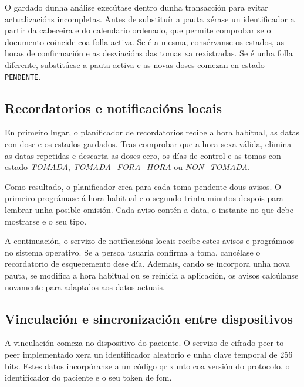 O gardado dunha análise execútase dentro dunha transacción para evitar actualizacións incompletas. Antes de substituír a pauta xérase un identificador a partir da cabeceira e do calendario ordenado, que permite comprobar se o documento coincide coa folla activa. Se é a mesma, consérvanse os estados, as horas de confirmación e as desviacións das tomas xa rexistradas. Se é unha folla diferente, substitúese a pauta activa e as novas doses comezan en estado \texttt{PENDENTE}.


\subsection{Recordatorios e notificacións locais}

En primeiro lugar, o planificador de recordatorios recibe a hora habitual, as datas con dose e os estados gardados. Tras comprobar que a hora sexa válida, elimina as datas repetidas e descarta as doses cero, os días de control e as tomas con estado \textit{TOMADA}, \textit{TOMADA\_FORA\_HORA} ou \textit{NON\_TOMADA}.

Como resultado, o planificador crea para cada toma pendente dous avisos. O primeiro prográmase á hora habitual e o segundo trinta minutos despois para lembrar unha posible omisión. Cada aviso contén a data, o instante no que debe mostrarse e o seu tipo.

A continuación, o servizo de notificacións locais recibe estes avisos e prográmaos no sistema operativo. Se a persoa usuaria confirma a toma, cancélase o recordatorio de esquecemento dese día. Ademais, cando se incorpora unha nova pauta, se modifica a hora habitual ou se reinicia a aplicación, os avisos calcúlanse novamente para adaptalos aos datos actuais.

\subsection{Vinculación e sincronización entre dispositivos}

A vinculación comeza no dispositivo do paciente. O servizo de cifrado peer to peer implementado xera un identificador aleatorio e unha clave temporal de 256 bits. Estes datos incorpóranse a un código \gls{qr} xunto coa versión do protocolo, o identificador do paciente e o seu \gls{token} de \gls{fcm}.

